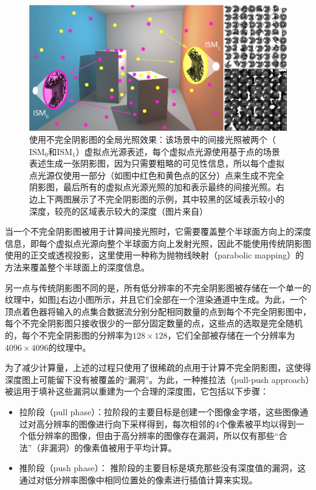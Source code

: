 \begin{figure}
	\includegraphics[width=\textwidth]{figures/ir/ir-4-2}
	\caption{使用不完全阴影图的全局光照效果：该场景中的间接光照被两个（$\text{ISM}_0$和$\text{ISM}_1$）虚拟点光源表述，每个虚拟点光源使用基于点的场景表述生成一张阴影图，因为只需要粗略的可见性信息，所以每个虚拟点光源仅使用一部分（如图中红色和黄色点的区分）点来生成不完全阴影图，最后所有的虚拟点光源光照的加和表示最终的间接光照。右边上下两图展示了不完全阴影图的示例，其中较黑的区域表示较小的深度，较亮的区域表示较大的深度（图片来自\cite{a:ImperfectShadowMapsforEfficientComputationofIndirectIllumination}）}
	\label{f:ir-imperfect-shadow-maps}
\end{figure}

当一个不完全阴影图被用于计算间接光照时，它需要覆盖整个半球面方向上的深度信息，即每个虚拟点光源向整个半球面方向上发射光照，因此不能使用传统阴影图使用的正交或透视投影，这里使用一种称为抛物线映射（parabolic mapping）\cite{a:ShadowMappingforHemisphericalandOmnidirectionalLightSources}的方法来覆盖整个半球面上的深度信息。

另一点与传统阴影图不同的是，所有低分辨率的不完全阴影图被存储在一个单一的纹理中，如图\ref{f:ir-imperfect-shadow-maps}右边小图所示，并且它们全部在一个渲染通道中生成。为此，一个顶点着色器将输入的点集合数据流分别分配相同数量的点到每个不完全阴影图中，每个不完全阴影图只接收很少的一部分固定数量的点，这些点的选取是完全随机的，每个不完全阴影图的分辨率为$128\times 128$，它们全部被存储在一个分辨率为$4096\times 4096$的纹理中。

为了减少计算量，上述的过程只使用了很稀疏的点用于计算不完全阴影图，这使得深度图上可能留下没有被覆盖的“漏洞”。为此，一种推拉法（pull-push approach）\cite{a:PointSampleRendering,a:EfficientPointBasedRenderingUsingImageReconstruction}被运用于填补这些漏洞以重建为一个合理的深度图，它包括以下步骤：

\begin{itemize}
	\item 拉阶段（pull phase）：拉阶段的主要目标是创建一个图像金字塔，这些图像通过对高分辨率的图像进行向下采样得到，每次相邻的4个像素被平均以得到一个低分辨率的图像，但由于高分辨率的图像存在漏洞，所以仅有那些“合法”（非漏洞）的像素值被用于平均计算。 
	\item 推阶段（push phase）： 推阶段的主要目标是填充那些没有深度值的漏洞，这通过对低分辨率图像中相同位置处的像素进行插值计算来实现。
\end{itemize}


